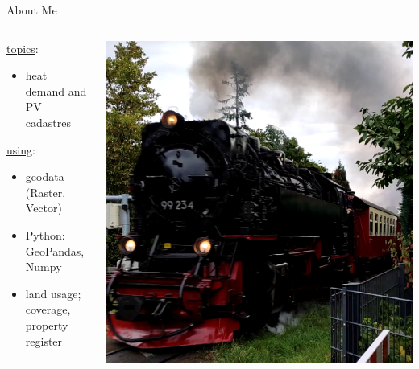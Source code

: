 
\pgfplotsset{compat=1.17}

\begin{frame}{About Me}
	\begin{columns}
		
		\begin{column}{0.45\textwidth}
			\begin{tcolorbox}[colback=white, colframe=ElixirPurple, arc=3mm, boxrule=0mm, height=0.8\textheight, valign=center, title=Working Live]
				
				\underline{topics}:
				\begin{itemize}
					\item heat demand and PV cadastres
				\end{itemize}
				\underline{using}:
				\begin{itemize}
					\item geodata (Raster, Vector)
					\item Python: GeoPandas, Numpy
					\item land usage; coverage, property register
				\end{itemize}
				
			\end{tcolorbox}
		\end{column}
		
		\begin{column}{0.45\textwidth}
			\begin{tcolorbox}[colback=white, colframe=ElixirPurple, arc=3mm, boxrule=0mm, height=0.8\textheight, valign=center, title=Privat Live]
				\includegraphics[width=\tcbtextwidth,   keepaspectratio]{pictures/vlcsnap-2024-01-31-23h37m06s479.png}
			\end{tcolorbox}
		\end{column}
		
	\end{columns}
\end{frame}